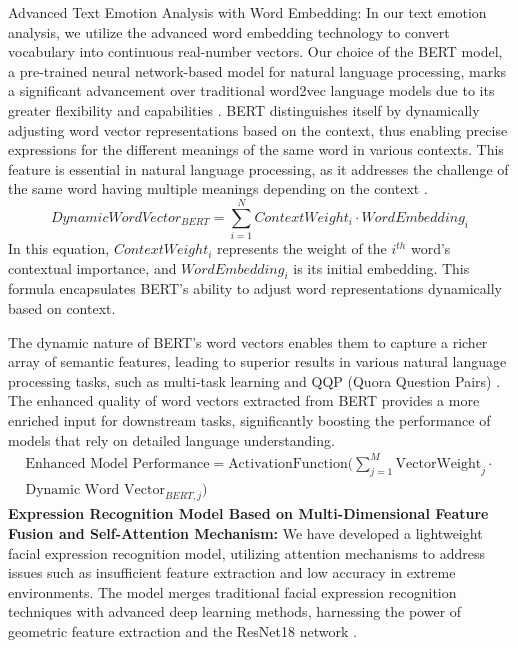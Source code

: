 \documentclass[preprint,12pt]{elsarticle}
\begin{document}
Advanced Text Emotion Analysis with Word Embedding: In our text emotion analysis, we utilize the advanced word embedding technology to convert vocabulary into continuous real-number vectors. Our choice of the BERT model, a pre-trained neural network-based model for natural language processing, marks a significant advancement over traditional word2vec language models due to its greater flexibility and capabilities \cite{ref36}. BERT distinguishes itself by dynamically adjusting word vector representations based on the context, thus enabling precise expressions for the different meanings of the same word in various contexts. This feature is essential in natural language processing, as it addresses the challenge of the same word having multiple meanings depending on the context \cite{ref37}.
\begin{equation}
Dynamic Word Vector_{BERT} = \sum_{i=1}^{N} ContextWeight_i \cdot WordEmbedding_i
\end{equation}
In this equation, \(ContextWeight_i\) represents the weight of the \(i^{th}\) word's contextual importance, and \(WordEmbedding_i\) is its initial embedding. This formula encapsulates BERT's ability to adjust word representations dynamically based on context.

The dynamic nature of BERT's word vectors enables them to capture a richer array of semantic features, leading to superior results in various natural language processing tasks, such as multi-task learning and QQP (Quora Question Pairs) \cite{ref38}. The enhanced quality of word vectors extracted from BERT provides a more enriched input for downstream tasks, significantly boosting the performance of models that rely on detailed language understanding.
\begin{equation}
\begin{aligned}
\text{Enhanced Model Performance} = \text{ActivationFunction} \bigg( \sum_{j=1}^{M} \text{VectorWeight}_j \cdot \\
\text{Dynamic Word Vector}_{BERT, j} \bigg)
\end{aligned}
\end{equation}
\textbf{Expression Recognition Model Based on Multi-Dimensional Feature Fusion and Self-Attention Mechanism:} We have developed a lightweight facial expression recognition model, utilizing attention mechanisms to address issues such as insufficient feature extraction and low accuracy in extreme environments. The model merges traditional facial expression recognition techniques with advanced deep learning methods, harnessing the power of geometric feature extraction and the ResNet18 network \cite{ref39}. 
\end{document}
